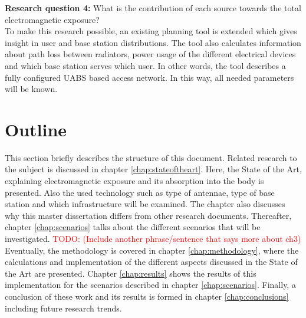 \textbf{Research question 4:} What is the contribution of each source towards the total electromagnetic exposure?\\

To make this research possible, an existing planning tool is extended which gives insight in user and base station distributions.
The tool also calculates information about path loss between radiators, power usage of the different electrical devices and which base station serves which user. In other words, the tool describes 
a fully configured \gls{UABS} based access network.
In this way, all needed parameters will be known.

\section{Outline}
\label{sec:structure}

This section briefly describes the structure of this document.
Related research to the subject is discussed in chapter  \ref{chap:stateoftheart}. 
Here, the State of the Art, explaining electromagnetic exposure and its absorption into the body is presented.  
Also the used technology such as type of antennae, type of base station and which infrastructure will be examined. 
The chapter also discusses why this master dissertation differs from other research documents. 
Thereafter, chapter \ref{chap:scenarios} talks about the different scenarios that will be
investigated. \textcolor{red}{TODO: (Include another phrase/sentence that says more about ch3)}
 Eventually, the methodology is covered in chapter \ref{chap:methodology}, where the calculations and implementation 
 of the different aspects discussed in the State of the Art are presented. 
 Chapter \ref{chap:results} shows the results of this implementation for the scenarios described in chapter \ref{chap:scenarios}. 
 Finally, a conclusion of these work and its results is formed in chapter \ref{chap:conclusions} including future research trends.